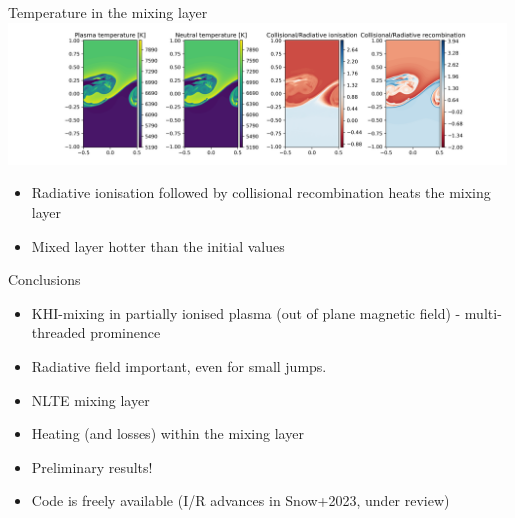 \documentclass[10pt,aspectratio=169,usenames,dvipsnames]{beamer}
\begin{document}

\begin{frame}{Temperature in the mixing layer}
\includegraphics[width=0.99\textwidth]{2023Mixing/Figures/KHInlev_rad_temperature.png}
\begin{itemize}
    \item Radiative ionisation followed by collisional recombination heats the mixing layer
    \item Mixed layer hotter than the initial values
\end{itemize}
\end{frame}

\begin{frame}{Conclusions}
\begin{itemize}
    \item KHI-mixing in partially ionised plasma (out of plane magnetic field) - multi-threaded prominence
    \item Radiative field important, even for small jumps.
    \item NLTE mixing layer
    \item Heating (and losses) within the mixing layer
    \item Preliminary results!
    \item Code is freely available (I/R advances in Snow+2023, under review)
\end{itemize}
\end{frame}
\end{document}
